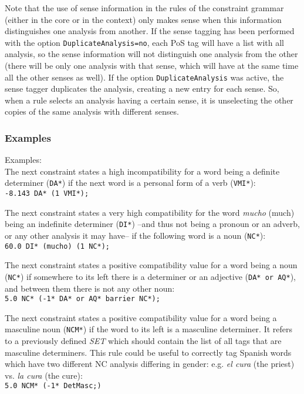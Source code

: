 \documentclass[a4paper]{book}
\begin{document}
    Note that the use of sense information in the rules of 
    the constraint grammar (either in the core or in the context) 
    only makes sense when this information distinguishes one analysis
    from another. If the sense tagging has been performed with the 
    option \verb#DuplicateAnalysis=no#, each PoS tag will have a list
    with all analysis, so the sense information will not distinguish
    one analysis from the other (there will be only one analysis with
    that sense, which will have at the same time all the other senses
    as well). 
    If the option \verb#DuplicateAnalysis# was active, the sense
    tagger duplicates the analysis, creating a new entry for each
    sense. So, when a rule selects an analysis having a certain sense,
    it is unselecting the other copies of the same analysis with 
    different senses.

\subsubsection{Examples}

	Examples:\\
	The next constraint states a high incompatibility for a word
	being a definite determiner ({\tt DA*}) if the next word is a personal form
	of a verb ({\tt VMI*}):\\
        {\tt -8.143  DA*  (1 VMI*); }
	
        The next constraint states a very high compatibility for the
        word {\sl mucho} (much) being an indefinite determiner ({\tt DI*}) 
        --and thus not being a pronoun or an adverb, or any
        other analysis it may have-- if the following word is a noun ({\tt NC*}):\\
        {\tt 60.0 DI* (mucho) (1 NC*);}

	The next constraint states a positive compatibility value for
	a word being a noun ({\tt NC*}) if somewhere to its left
	there is a determiner or an adjective ({\tt DA* or AQ*}), and
	between them there is not any other noun:\\
        {\tt 5.0 NC* (-1* DA* or AQ* barrier NC*);}

	The next constraint states a positive compatibility value for
	a word being a masculine noun ({\tt NCM*}) if the word to its
	left is a masculine determiner. It refers to a previously
	defined {\em SET} which should contain the list of all tags
	that are masculine determiners. This rule could be useful to
	correctly tag Spanish words which have two different NC
	analysis differing in gender: e.g. {\em el cura} (the priest)
	vs. {\em la cura} (the cure):\\
        {\tt 5.0 NCM* (-1* {DetMasc};)}
\end{document}
